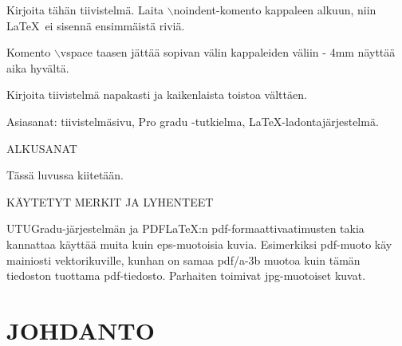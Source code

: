 
\noindent Kirjoita tähän tiivistelmä. Laita $\backslash${noindent}-komento kappaleen
alkuun, niin \LaTeX\, ei sisennä ensimmäistä riviä.

\vspace{7mm}\noindent Komento $\backslash$vspace taasen jättää sopivan välin kappaleiden väliin - 4mm näyttää aika hyvältä.

\vspace{7mm}\noindent Kirjoita tiivistelmä napakasti ja kaikenlaista toistoa välttäen.

\vspace{7mm}\noindent Asiasanat: tiivistelmäsivu, Pro gradu -tutkielma, \LaTeX-ladontajärjestelmä.



\newpage\null
\doublespacing
\tableofcontents



\newpage\null
\pagestyle{plain} 
ALKUSANAT
\vspace{1.2cm}

Tässä luvussa kiitetään.

\newpage\null
\pagestyle{plain} 
\noindent KÄYTETYT MERKIT JA LYHENTEET

\vspace{1.2cm}
\noindent UTUGradu-järjestelmän ja PDF\LaTeX :n pdf-formaattivaatimusten takia kannattaa käyttää muita kuin eps-muotoisia kuvia. Esimerkiksi pdf-muoto käy mainiosti vektorikuville, kunhan on samaa pdf/a-3b muotoa kuin tämän tiedoston tuottama pdf-tiedosto. Parhaiten toimivat jpg-muotoiset kuvat.


\newpage\null
\pagestyle{plain} 

\section{JOHDANTO}

\lipsum[1]
\vspace{0.7cm}
\lipsum[1]



